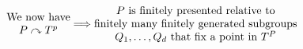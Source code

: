 \documentclass{beamer}[10]
\begin{document}
\begin{frame}
    \begin{equation*}
        \begin{matrix}
            \text{We now have} \\
            P\curvearrowright T^p
        \end{matrix}
              \Longrightarrow  
        \begin{matrix} 
                \text{$P$ is finitely presented relative to} \\
                \text{finitely many finitely generated subgroups} \\
                \text{$Q_1,\ldots,Q_d$ that fix a point in $T^P$}
        \end{matrix}  
    \end{equation*}


\end{frame}
\end{document}
